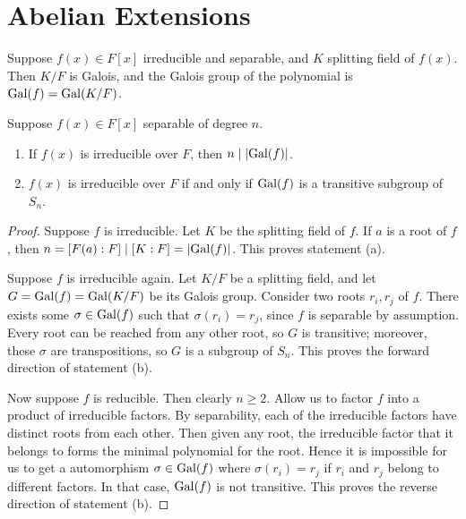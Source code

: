 \section{Abelian Extensions}

\begin{definition}
    Suppose \(f(x) \in F[x]\) irreducible and separable,
    and \(K\) splitting field of \(f(x)\).
    Then \(K/F\) is Galois,
    and the Galois group of the polynomial is \(\operatorname{Gal}(f) = \operatorname{Gal}(K/F)\).
\end{definition}
\begin{theorem}
    Suppose \(f(x) \in F[x]\) separable of degree \(n\).
    \begin{enumerate}[label={(\alph*)}, itemsep=0mm]
        \item If \(f(x)\) is irreducible over \(F\),
            then \(n \mid \abs{\operatorname{Gal}(f)}\).
        \item \(f(x)\) is irreducible over \(F\)
            if and only if \(\operatorname{Gal}(f)\) is a transitive subgroup of \(S_n\).
    \end{enumerate}
\end{theorem}
\begin{proof}
    Suppose \(f\) is irreducible.
    Let \(K\) be the splitting field of \(f\).
    If \(a\) is a root of \(f\), then \(n = [F(a):F] \mid [K:F] = \abs{\operatorname{Gal}(f)}\).
    This proves statement (a).

    Suppose \(f\) is irreducible again.
    Let \(K/F\) be a splitting field, and let \(G = \operatorname{Gal}(f) = \operatorname{Gal}(K/F)\) be its Galois group.
    Consider two roots \(r_i,r_j\) of \(f\).
    There exists some \(\sigma \in \operatorname{Gal}(f)\) such that \(\sigma(r_i) = r_j\),
    since \(f\) is separable by assumption.
    Every root can be reached from any other root, so \(G\) is transitive;
    moreover, these \(\sigma\) are transpositions, so \(G\) is a subgroup of \(S_n\).
    This proves the forward direction of statement (b).

    Now suppose \(f\) is reducible. Then clearly \(n \geq 2\).
    Allow us to factor \(f\) into a product of irreducible factors.
    By separability, each of the irreducible factors have distinct roots from each other.
    Then given any root, the irreducible factor that it belongs to
    forms the minimal polynomial for the root.
    Hence it is impossible for us to get a automorphism \(\sigma \in \operatorname{Gal}(f)\)
    where \(\sigma(r_i) = r_j\) if \(r_i\) and \(r_j\) belong to different factors.
    In that case, \(\operatorname{Gal}(f)\) is not transitive.
    This proves the reverse direction of statement (b).
\end{proof}

